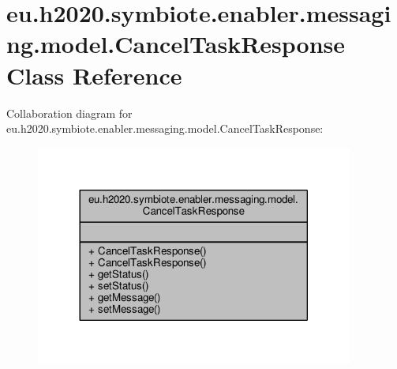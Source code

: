 \hypertarget{classeu_1_1h2020_1_1symbiote_1_1enabler_1_1messaging_1_1model_1_1CancelTaskResponse}{}\section{eu.\+h2020.\+symbiote.\+enabler.\+messaging.\+model.\+Cancel\+Task\+Response Class Reference}
\label{classeu_1_1h2020_1_1symbiote_1_1enabler_1_1messaging_1_1model_1_1CancelTaskResponse}


Collaboration diagram for eu.\+h2020.\+symbiote.\+enabler.\+messaging.\+model.\+Cancel\+Task\+Response\+:
\nopagebreak
\begin{figure}[H]
\begin{center}
\leavevmode
\includegraphics[width=296pt]{classeu_1_1h2020_1_1symbiote_1_1enabler_1_1messaging_1_1model_1_1CancelTaskResponse__coll__graph}
\end{center}
\end{figure}
